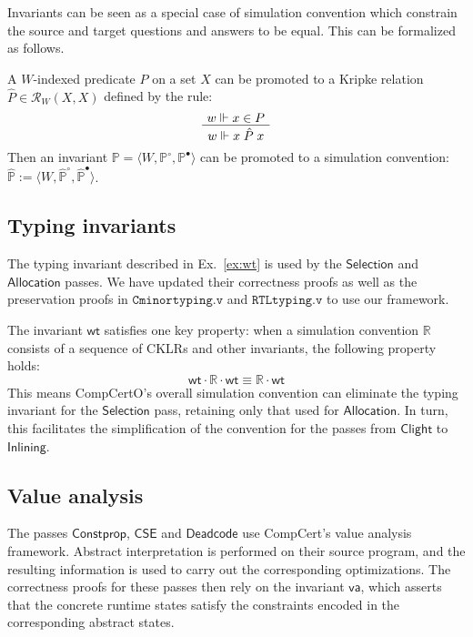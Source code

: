 \documentclass[sigplan,screen,review]{acmart}
\newcommand{\kw}[1]{\ensuremath{ \mathsf{#1} }}
\newcommand{\que}{\circ}
\newcommand{\ans}{\bullet}
\newenvironment{optional}{}{}
\begin{document}
\begin{optional}
Invariants can be seen as a special case of simulation convention
which constrain the source and target questions and answers
to be equal.
This can be formalized as follows.

\begin{definition}
A $W$-indexed predicate $P$ on a set $X$
can be promoted to a Kripke relation
$\hat{P} \in \mathcal{R}_W(X, X)$
defined by the rule:
\[
  \AxiomC{$w \Vdash x \in P$}
  \UnaryInfC{$w \Vdash x \mathrel{\hat{P}} x$}
  \DisplayProof
\]
Then an invariant
$\mathbb{P} = \langle W, \mathbb{P}^\que, \mathbb{P}^\ans \rangle$
can be promoted to a simulation convention:
$\hat{\mathbb{P}} :=
 \langle W, \hat{\mathbb{P}}^\que, \hat{\mathbb{P}}^\ans \rangle$.
\end{definition}


\subsection{Typing invariants} \label{sec:wt} %

The typing invariant described in Ex.~\ref{ex:wt}
is used by the $\kw{Selection}$ and $\kw{Allocation}$ passes.
We have updated their correctness proofs
as well as the preservation proofs in
$\texttt{Cminortyping.v}$ and $\texttt{RTLtyping.v}$
to use our framework.

The invariant $\kw{wt}$ satisfies one key property:
when a simulation convention $\mathbb{R}$
consists of a sequence of CKLRs and other invariants,
the following property holds:
\[
  \kw{wt} \cdot \mathbb{R} \cdot \kw{wt} \equiv
  \mathbb{R} \cdot \kw{wt}
\]
This means CompCertO's overall simulation convention
can eliminate the typing invariant for the $\kw{Selection}$ pass,
retaining only that used for $\kw{Allocation}$.
In turn, this facilitates the simplification of the convention for
the passes from \kw{Clight} to \kw{Inlining}.


\subsection{Value analysis} \label{sec:va} %

The passes
$\kw{Constprop}$, $\kw{CSE}$ and $\kw{Deadcode}$
use CompCert's value analysis framework.
Abstract interpretation is performed %
on their source program,
and the resulting information is used to carry out
the corresponding optimizations.
The correctness proofs for these passes then rely
on the invariant $\kw{va}$,
which asserts that the concrete runtime states
satisfy the constraints encoded in the corresponding
abstract states.


\end{optional}
\end{document}
